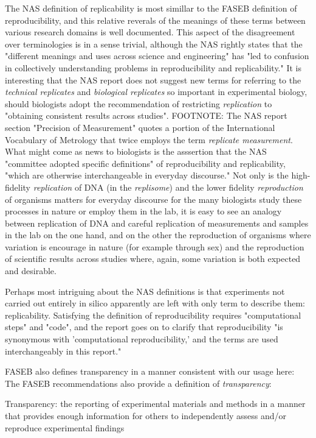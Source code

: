 The NAS definition of replicability is most simillar to the FASEB definition of reproducibility, and this relative reverals 
	of the meanings of these terms between various research domains is well documented.
This aspect of the disagreement over terminologies is in a sense trivial, although the NAS rightly 
	states that the "different meanings and uses across science and engineering" has "led to confusion in collectively 
	understanding problems in reproducibility and replicability."
It is interesting that the NAS report does not suggest new terms for referring to the \emph{technical replicates} 
	and  \emph{biological replicates} so important in experimental biology, should biologists adopt the recommendation 
	of restricting \emph{replication} to "obtaining consistent results across studies".
FOOTNOTE: The NAS report section "Precision of Measurement" quotes a portion of the International Vocabulary of
	Metrology that twice employs the term \emph{replicate measurement}.
What might come as news to biologists is the asssertion that the NAS "committee adopted specific definitions" of 
	reproducibility and replicability, "which are otherwise interchangeable in everyday discourse."
Not only is the high-fidelity \emph{replication} of DNA (in the \emph{replisome}) and the lower fidelity \emph{reproduction}
	of organisms  matters for everyday discourse for the many biologists study these processes in nature or employ them in the lab,
	it is easy to see an analogy between replication of DNA and careful replication of measurements and samples
	in the lab on the one hand, and on the other the reproduction of organisms where variation is encourage in nature
	(for example through sex) and the reproduction of scientific results across studies where, again, some variation is both 
	expected and desirable.

Perhaps most intriguing about the NAS definitions is that experiments not carried out entirely in silico apparently are left with only term
	to describe them: replicability. Satisfying the definition of reproducibility requires "computational steps" and "code", and  
	the report goes on to clarify that reproducibility "is synonymous with 'computational reproducibility,' and the terms are
	used interchangeably in this report."

FASEB also defines transparency in a manner consistent with our usage here:
The FASEB recommendations also provide a definition of \emph{transparency}:

	Transparency:  the reporting of experimental materials and methods in a manner that provides enough information 
	for others to independently assess and/or reproduce experimental findings

